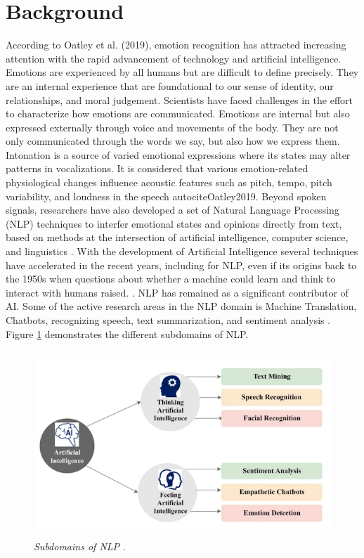 \section{Background}
According to Oatley et al. (2019), emotion recognition has attracted increasing attention with the rapid advancement of technology and artificial intelligence. Emotions are experienced by all humans but are difficult to define precisely. They are an internal experience that are foundational to our sense of identity, our relationships, and moral judgement. Scientists have faced challenges in the effort to characterize how emotions are communicated. Emotions are internal but also expressed externally through voice and movements of the body. They are not only communicated through the words we say, but also how we express them. Intonation is a source of varied emotional expressions where its states may alter patterns in vocalizations. It is considered that various emotion-related physiological changes influence acoustic features such as pitch, tempo, pitch variability, and loudness in the speech autocite{Oatley2019}. Beyond spoken signals, researchers have also developed a set of Natural Language Processing (NLP) techniques to interfer emotional states and opinions directly from text, based on methods at the intersection of artificial intelligence, computer science, and linguistics \autocite{Kansara2020}.
With the development of Artificial Intelligence several techniques have accelerated in the recent years, including for NLP, even if its origins back to the 1950s when questions about whether a machine could learn and think to interact with humans raised. \autocite{Alvarez2024}. NLP has remained as a significant contributor of AI. Some of the active research areas in the NLP domain is Machine Translation, Chatbots, recognizing speech, text summarization, and sentiment analysis \autocite{Kusal2023}. Figure \ref{fig:subdomains-AI} demonstrates the different subdomains of NLP. 
\begin{figure}[ht]
    \centering
    \includegraphics[height=7cm]{png/subdomains AI.png}
    \caption{\textit{Subdomains of NLP \autocite{Kusal2023}}.}
    \label{fig:subdomains-AI}
\end{figure}

